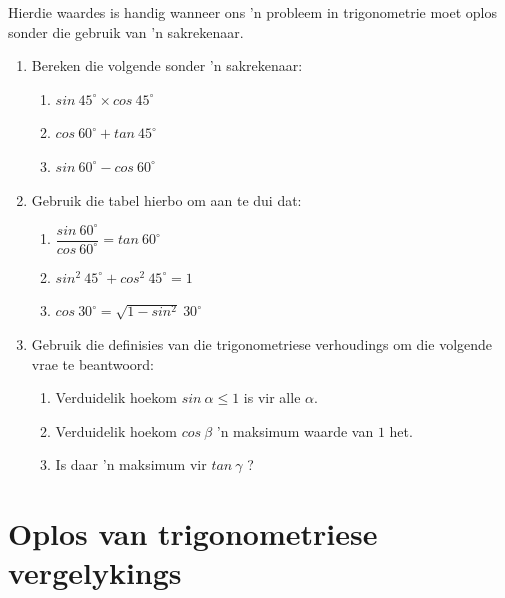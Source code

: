 \par
Hierdie waardes is handig wanneer ons 'n probleem in trigonometrie moet oplos sonder die gebruik van 'n sakrekenaar.\par 
\begin{exercises}{}
{
\begin{enumerate}[itemsep=6pt, label=\textbf{\arabic*}. ] 
\item Bereken die volgende sonder 'n sakrekenaar:
\begin{enumerate}[noitemsep, label=\textbf{(\alph*)} ]
\item $sin~45^{\circ} \times cos~45^{\circ}$
\item $cos~60^{\circ} + tan~45^{\circ}$
\item $sin~60^{\circ} - cos~60^{\circ}$
\end{enumerate}

\item Gebruik die tabel hierbo om aan te dui dat:
\begin{enumerate}[itemsep=5pt, label=\textbf{(\alph*)} ]
\item $\dfrac{sin~60^{\circ}}{cos~60^{\circ}} = tan~60^{\circ} $
\item $sin^{2}~45^{\circ}+ cos^{2}~45^{\circ} =1 $
\item $cos~30^{\circ} =\sqrt{1- sin^{2}}~30^{\circ}$
\end{enumerate}

\item Gebruik die definisies van die trigonometriese verhoudings om die volgende vrae te beantwoord:
\begin{enumerate}[noitemsep, label=\textbf{(\alph*)} ]
\item Verduidelik hoekom $sin~\alpha \leq 1$ is vir alle $\alpha$.
\item Verduidelik hoekom $cos~\beta$ 'n maksimum waarde van $1$ het.
\item Is daar 'n maksimum vir $tan~\gamma$ ?
\end{enumerate}
\end{enumerate}

}
\end{exercises}



\section{Oplos van trigonometriese vergelykings}


